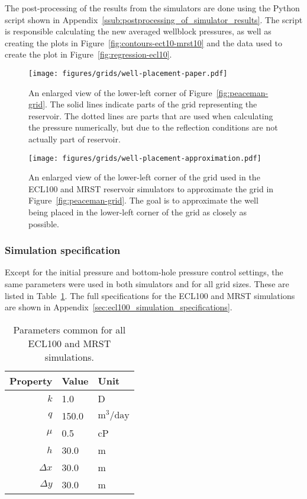 The post-processing of the results from the simulators are done using the Python script shown in Appendix~\ref{ssub:postprocessing_of_simulator_results}. The script is responsible calculating the new averaged wellblock pressures, as well as creating the plots in Figure~\ref{fig:contours-ect10-mrst10} and the data used to create the plot in Figure~\ref{fig:regression-ecl10}.


\begin{figure}[htbp]
    \centering
    \texttt{[image: figures/grids/well-placement-paper.pdf]}
    \caption{An enlarged view of the lower-left corner of Figure~\ref{fig:peaceman-grid}. The solid lines indicate parts of the grid representing the reservoir. The dotted lines are parts that are used when calculating the pressure numerically, but due to the reflection conditions are not actually part of reservoir.}
    \label{fig:well-placement-paper}
\end{figure}

\begin{figure}[htbp]
    \centering
    \texttt{[image: figures/grids/well-placement-approximation.pdf]}
    \caption{An enlarged view of the lower-left corner of the grid used in the ECL100 and MRST reservoir simulators to approximate the grid in Figure~\ref{fig:peaceman-grid}. The goal is to approximate the well being placed in the lower-left corner of the grid as closely as possible.}
    \label{fig:well-placement-approximation}
\end{figure}

\subsubsection{Simulation specification} %
\label{ssub:simulation_specification}

Except for the initial pressure and bottom-hole pressure control settings, the same parameters were used in both simulators and for all grid sizes. These are listed in Table~\ref{tbl:simulation-parameters}. The full specifications for the ECL100 and MRST simulations are shown in Appendix~\ref{sec:ecl100_simulation_specifications}.

\begin{table}
    \caption{Parameters common for all ECL100 and MRST simulations.}
    \centering
    \begin{tabular}{rll}
        \toprule
        Property & Value & Unit \\
        \midrule
        $k$        & 1.0   & D                           \\
        $q$        & 150.0 & $\mathrm{m}^3/\mathrm{day}$ \\
        $\mu$      & 0.5   & cP                          \\
        $h$        & 30.0  & m                           \\
        $\Delta x$ & 30.0  & m                           \\
        $\Delta y$ & 30.0  & m                           \\
        \bottomrule
    \end{tabular}
    \label{tbl:simulation-parameters}
\end{table}

